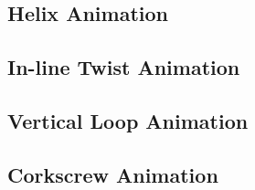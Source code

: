 \documentclass[12pt,twoside,a4paper]{article}
\begin{document}
	\newpage
	
	\subsection{Helix Animation}
	\label{sec:Appendix III_Helix}
	
	\newpage
	
	\subsection{In-line Twist Animation}
	\label{sec:Appendix III_In-line Twist}

	\newpage

	\subsection{Vertical Loop Animation}
	\label{sec:Appendix III_Vertical Loop}
	
	\newpage
	
	\subsection{Corkscrew Animation}
	\label{sec:Appendix III_Corkscrew}
\end{document}
